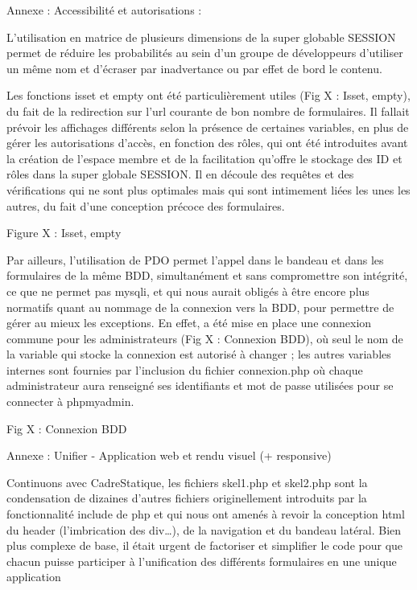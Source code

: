 \documentclass[12pt]{report}
\begin{document}
Annexe : Accessibilité et autorisations :
\bigskip
\par
L’utilisation en matrice de plusieurs dimensions de la super globable SESSION permet de réduire les probabilités au sein d’un groupe de développeurs d’utiliser un même nom et d’écraser par inadvertance ou par effet de bord le contenu.
\bigskip
\par
Les fonctions isset et empty ont été particulièrement utiles (Fig X : Isset, empty), du fait de la redirection sur l’url courante de bon nombre de formulaires. Il fallait prévoir les affichages différents selon la présence de certaines variables, en plus de gérer les autorisations d’accès, en fonction des rôles, qui ont été introduites avant la création de l’espace membre et de la facilitation qu’offre le stockage des ID et rôles dans la super globale SESSION. Il en découle des requêtes et des vérifications qui ne sont plus optimales mais qui sont intimement liées les unes les autres, du fait d’une conception précoce des formulaires.
\bigskip
\par
Figure X : Isset, empty
\bigskip
\par
Par ailleurs, l’utilisation de PDO permet l’appel dans le bandeau et dans les formulaires de la
même BDD, simultanément et sans compromettre son intégrité, ce que ne permet pas mysqli, et qui
nous aurait obligés à être encore plus normatifs quant au nommage de la connexion vers la BDD,
pour permettre de gérer au mieux les exceptions. En effet, a été mise en place une connexion
commune pour les administrateurs (Fig X : Connexion BDD), où seul le nom de la variable qui
stocke la connexion est autorisé à changer ; les autres variables internes sont fournies par l’inclusion
du fichier connexion.php où chaque administrateur aura renseigné ses identifiants et mot de passe
utilisées pour se connecter à phpmyadmin.
\bigskip
\par
Fig X : Connexion BDD
\bigskip
\par
Annexe : Unifier - Application web et rendu visuel (+ responsive)
\bigskip
\par
Continuons avec CadreStatique, les fichiers skel1.php et skel2.php sont la condensation de
dizaines d’autres fichiers originellement introduits par la fonctionnalité include de php et qui nous
ont amenés à revoir la conception html du header (l’imbrication des div…), de la navigation et du
bandeau latéral. Bien plus complexe de base, il était urgent de factoriser et simplifier le code pour
que chacun puisse participer à l’unification des différents formulaires en une unique application
\end{document}
